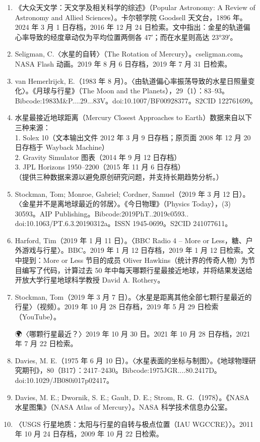 \begin{enumerate}
    \item 《大众天文学：天文学及相关科学的综述》（Popular Astronomy: A Review of Astronomy and Allied Sciences）。卡尔顿学院 Goodsell 天文台，1896 年。2024 年 3 月 1 日存档，2016 年 12 月 24 日检索。文中指出：金星的轨道偏心率导致的经度章动仅为平均位置两侧各 47′；而在水星则高达 23°39′。
    \item Seligman, C.〈水星的自转〉（The Rotation of Mercury）。cseligman.com。NASA Flash 动画。2019 年 8 月 6 日存档，2019 年 7 月 31 日检索。
    \item van Hemerlrijck, E.（1983 年 8 月）。〈由轨道偏心率振荡导致的水星日照量变化〉。《月球与行星》（The Moon and the Planets），29（1）：83–93。Bibcode:1983M&P....29...83V。doi:10.1007/BF00928377。S2CID 122761699。
    \item 水星最接近地球距离（Mercury Closest Approaches to Earth）数据来自以下三种来源：\\
    1. Solex 10（文本输出文件 2012 年 3 月 9 日存档；原页面 2008 年 12 月 20 日存档于 Wayback Machine）\\
    2. Gravity Simulator 图表（2014 年 9 月 12 日存档）\\
    3. JPL Horizons 1950–2200（2015 年 11 月 6 日存档）\\
   （提供三种数据来源以避免原创研究问题，并支持长期趋势分析。）
    \item Stockman, Tom; Monroe, Gabriel; Cordner, Samuel（2019 年 3 月 12 日）。〈金星并不是离地球最近的邻居〉。《今日物理》（Physics Today），(3) 30593。AIP Publishing。Bibcode:2019PhT..2019c0593.. doi:10.1063/PT.6.3.20190312a。ISSN 1945-0699。S2CID 241077611。
    \item Harford, Tim（2019 年 1 月 11 日）。〈BBC Radio 4 – More or Less，糖、户外游戏与行星〉。BBC。2019 年 1 月 12 日存档，2019 年 1 月 12 日检索。文中提到：More or Less 节目的成员 Oliver Hawkins（统计界的传奇人物）为节目编写了代码，计算过去 50 年中每天哪颗行星最接近地球，并将结果发送给开放大学行星地球科学教授 David A. Rothery。
    \item Stockman, Tom（2019 年 3 月 7 日）。〈水星是距离其他全部七颗行星最近的行星〉（视频）。2019 年 10 月 28 日存档，2019 年 5 月 29 日检索（YouTube）。

🌍〈哪颗行星最近？〉2019 年 10 月 30 日。2021 年 10 月 28 日存档，2021 年 7 月 22 日检索。
    \item Davies, M. E.（1975 年 6 月 10 日）。〈水星表面的坐标与制图〉。《地球物理研究期刊》，80（B17）：2417–2430。Bibcode:1975JGR....80.2417D。doi:10.1029/JB080i017p02417。
    \item Davies, M. E.; Dwornik, S. E.; Gault, D. E.; Strom, R. G.（1978）。《NASA 水星图集》（NASA Atlas of Mercury）。NASA 科学技术信息办公室。
    \item 〈USGS 行星地质：太阳与行星的自转与极点位置（IAU WGCCRE）〉。2011 年 10 月 24 日存档，2009 年 10 月 22 日检索。


\end{enumerate}
